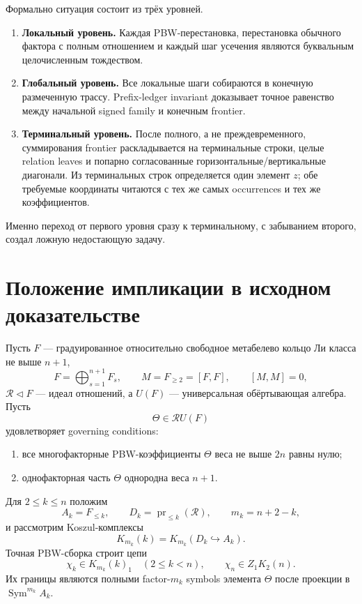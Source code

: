 \documentclass[11pt,a4paper]{article}
\theoremstyle{definition}
\theoremstyle{remark}
\newcommand{\Sym}{\operatorname{Sym}}
\newcommand{\pr}{\operatorname{pr}}
\newcommand{\Rel}{\mathcal R}
\begin{document}
Формально ситуация состоит из трёх уровней.

\begin{enumerate}
\item \textbf{Локальный уровень.} Каждая PBW-перестановка, перестановка
обычного фактора с полным отношением и каждый шаг усечения являются буквальным
целочисленным тождеством.

\item \textbf{Глобальный уровень.} Все локальные шаги собираются в конечную
размеченную трассу. Prefix-ledger invariant доказывает точное равенство между
начальной signed family и конечным frontier.

\item \textbf{Терминальный уровень.} После полного, а не преждевременного,
суммирования frontier раскладывается на терминальные строки, целые relation
leaves и попарно согласованные горизонтальные/вертикальные диагонали. Из
терминальных строк определяется один элемент $z$; обе требуемые координаты
читаются с тех же самых occurrences и тех же коэффициентов.
\end{enumerate}

Именно переход от первого уровня сразу к терминальному, с забыванием второго,
создал ложную недостающую задачу.

\section{Положение импликации в исходном доказательстве}

Пусть $F$ --- градуированное относительно свободное метабелево кольцо Ли
класса не выше $n+1$,
\[
 F=\bigoplus_{s=1}^{n+1}F_s,
 \qquad M=F_{\ge 2}=[F,F],
 \qquad [M,M]=0,
\]
$\Rel\triangleleft F$ --- идеал отношений, а $U(F)$ --- универсальная
обёртывающая алгебра. Пусть
\[
 \Theta\in \Rel U(F)
\]
удовлетворяет governing conditions:

\begin{enumerate}[label=(G\arabic*)]
\item все многофакторные PBW-коэффициенты $\Theta$ веса не выше $2n$ равны
нулю;
\item однофакторная часть $\Theta$ однородна веса $n+1$.
\end{enumerate}

Для $2\le k\le n$ положим
\[
 A_k=F_{\le k},\qquad D_k=\pr_{\le k}(\Rel),
 \qquad m_k=n+2-k,
\]
и рассмотрим Koszul-комплексы
\[
 K_{m_k}(k)=K_{m_k}(D_k\hookrightarrow A_k).
\]
Точная PBW-сборка строит цепи
\[
 \chi_k\in K_{m_k}(k)_1\quad(2\le k<n),
 \qquad
 \chi_n\in Z_1K_2(n).
\]
Их границы являются полными factor-$m_k$ symbols элемента $\Theta$ после
проекции в $\Sym^{m_k}A_k$.
\end{document}
